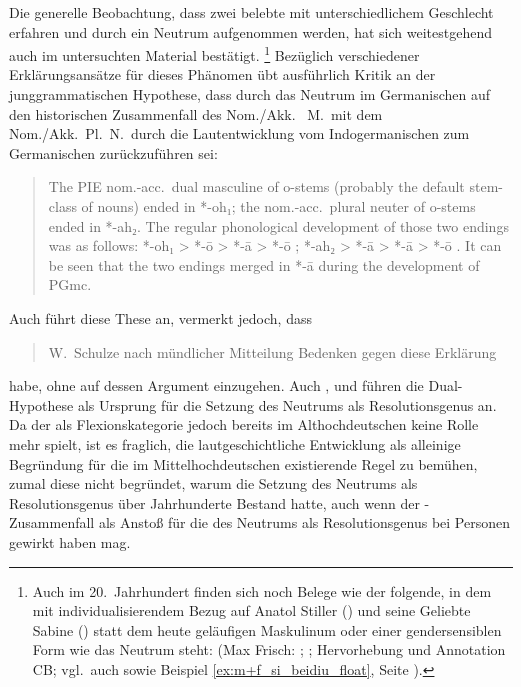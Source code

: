 Die generelle Beobachtung, dass zwei belebte  mit
unterschiedlichem Geschlecht  erfahren und durch ein
Neutrum aufgenommen werden, hat sich weitestgehend auch im untersuchten
Material bestätigt.%
%
	\footnote{Auch im 20.~Jahrhundert finden sich noch
		Belege wie der folgende, in dem mit
		individualisierendem Bezug auf Anatol Stiller
		(\MascM) und seine Geliebte Sabine (\FemF) statt dem heute geläufigen
		Maskulinum oder einer gendersensiblen Form wie 
		das Neutrum steht:  (Max Frisch:
		; \cite[332--333]{frisch:stiller}; Hervorhebung und
		Annotation CB; vgl.~auch \cite[188]{dal2014} sowie Beispiel
		\ref{ex:m+f_si_beidiu_float}, Seite \pageref{ex:m+f_si_beidiu_float}).
	}
%
Bezüglich verschiedener Erklärungs\-ansätze für dieses Phänomen übt
\citet[213--221]{askedal1973} ausführlich Kritik an der
junggrammatischen Hypothese, dass 
durch das Neutrum im Germanischen auf den
historischen Zusammenfall des Nom./Akk.\  M.\ mit dem
Nom./Akk.~Pl.~N.\ durch die Laut\-entwicklung vom
Indogermanischen zum Germanischen
zurückzuführen sei: \foreignblockcquote{english}[196]{ringe2017}{The PIE
nom.-acc.\ dual masculine of o-stems (probably the default
stem-class of nouns) ended in *-oh₁; the nom.-acc.\ plural neuter of o-stems
ended in *-ah₂. The regular phonological development of those two endings was
as follows: *-oh₁ > *-ō \textelp{} > *-ā > *-ō \textelp{}; *-ah₂ > *-ā
\textelp{} > *-ā > *-ō \textelp{}. It can be seen that the two endings merged
in *-ā during the development of PGmc.}

Auch \citeauthor{behaghel1928} führt diese These an, vermerkt
jedoch, dass \blockcquote[40]{behaghel1928}{W.~Schulze \textelp{} nach
mündlicher Mitteilung Bedenken gegen diese Erklärung} habe, ohne
auf dessen Argument einzugehen. Auch \citet[157]{hock2008},
\citet[196]{ringe2017} und \citet[104]{miller2019} führen die Dual-Hypothese
als Ursprung für die Setzung des Neutrums als Resolutionsgenus an. Da der  als Flexionskategorie jedoch bereits im
Althochdeutschen keine Rolle mehr spielt, ist es fraglich,
die lautgeschichtliche Entwicklung als alleinige Begründung für die im
Mittel\-hoch\-deutschen existierende Regel zu bemühen,
zumal diese nicht begründet, warum die Setzung des Neutrums als
Resolutionsgenus über Jahrhunderte Bestand hatte, auch
wenn der -Zusammenfall als Anstoß für die 
des Neutrums als Resolutionsgenus bei Personen gewirkt
haben mag.

